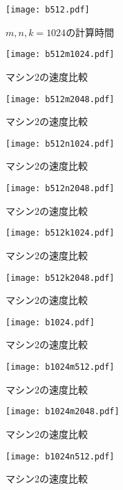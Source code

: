 \documentclass[11pt,a4paper]{jsreport}
\theoremstyle{definition}
\begin{document}
\begin{figure}[H]
\centering
\texttt{[image: b512.pdf]}
\caption{$m,n,k = 1024$の計算時間}
\end{figure}

\begin{figure}[H]
\centering
\texttt{[image: b512m1024.pdf]}
\caption{マシン2の速度比較}
\end{figure}

\begin{figure}[H]
\centering
\texttt{[image: b512m2048.pdf]}
\caption{マシン2の速度比較}
\end{figure}

\begin{figure}[H]
\centering
\texttt{[image: b512n1024.pdf]}
\caption{マシン2の速度比較}
\end{figure}

\begin{figure}[H]
\centering
\texttt{[image: b512n2048.pdf]}
\caption{マシン2の速度比較}
\end{figure}

\begin{figure}[H]
\centering
\texttt{[image: b512k1024.pdf]}
\caption{マシン2の速度比較}
\end{figure}

\begin{figure}[H]
\centering
\texttt{[image: b512k2048.pdf]}
\caption{マシン2の速度比較}
\end{figure}

\begin{figure}[H]
\centering
\texttt{[image: b1024.pdf]}
\caption{マシン2の速度比較}
\end{figure}

\begin{figure}[H]
\centering
\texttt{[image: b1024m512.pdf]}
\caption{マシン2の速度比較}
\end{figure}

\begin{figure}[H]
\centering
\texttt{[image: b1024m2048.pdf]}
\caption{マシン2の速度比較}
\end{figure}

\begin{figure}[H]
\centering
\texttt{[image: b1024n512.pdf]}
\caption{マシン2の速度比較}
\end{figure}
\end{document}

